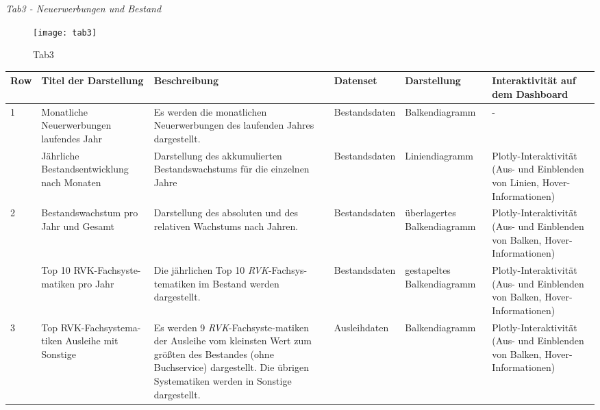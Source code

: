 \clearpage
    
    

    \recalctypearea
    \textit{Tab3 - Neuerwerbungen und Bestand}
    \begin{figure}[H]
        \centering
            \texttt{[image: tab3]}
            \caption{Tab3}
            \label{fig:tab3}
    \end{figure}

    \recalctypearea 
    \begingroup
    \setlength{\tabcolsep}{12pt} %
    \renewcommand{\arraystretch}{1.0} 
    \begin{table}[H]
        \LARGE
        \centering
        \begin{adjustbox}{max width=\textwidth}
        \begin{tabular}{p{}p{}p{}p{}p{}p{}}
           \toprule
           Row        &Titel der Darstellung &Beschreibung &Datenset &Darstellung &Interaktivität auf dem Dashboard\\
           \midrule
            1           &Monatliche Neuerwerbungen laufendes Jahr&Es werden die monatlichen Neuerwerbungen des laufenden Jahres dargestellt.&Bestandsdaten&Balkendiagramm&-\\
                        &Jährliche Bestandsentwicklung nach Monaten&Darstellung des akkumulierten Bestandswachstums für die einzelnen Jahre&Bestandsdaten&Liniendiagramm    &Plotly-Interaktivität (Aus- und Einblenden von Linien, Hover-Informationen)\\          
            \midrule
            2           &Bestandswachstum pro Jahr und Gesamt&Darstellung des absoluten und des relativen Wachstums nach Jahren.&Bestandsdaten&überlagertes Balkendiagramm&Plotly-Interaktivität (Aus- und Einblenden von Balken, Hover-Informationen)\\
                        &Top 10 RVK-Fachsyste-matiken pro Jahr&Die jährlichen Top 10 \textit{\acrshort{RVK}}-Fachsys-tematiken im Bestand werden dargestellt.&Bestandsdaten    &gestapeltes Balkendiagramm&Plotly-Interaktivität (Aus- und Einblenden von Balken, Hover-Informationen)\\
            \midrule
            3           &Top RVK-Fachsystema-tiken Ausleihe mit Sonstige&Es werden 9 \textit{\acrshort{RVK}}-Fachsyste-matiken der Ausleihe vom kleinsten Wert zum größten des Bestandes (ohne Buchservice) dargestellt. Die übrigen Systematiken werden in Sonstige dargestellt.&Ausleihdaten&Balkendiagramm&Plotly-Interaktivität (Aus- und Einblenden von Balken, Hover-Informationen)\\

\end{tabular}
\end{adjustbox}
\end{table}
